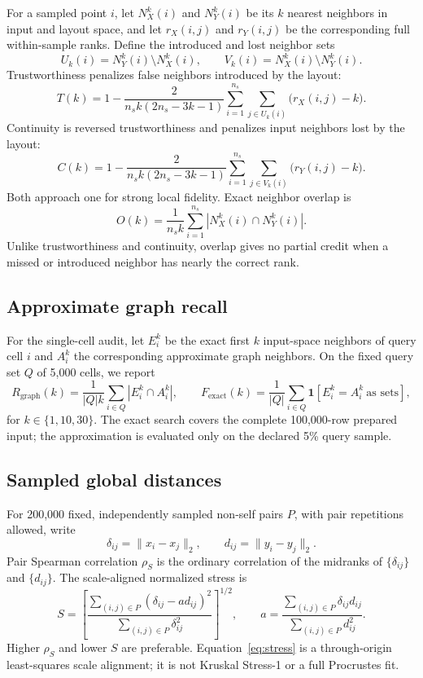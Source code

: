 \documentclass[10pt]{article}
\newcommand{\ind}{\mathbf{1}}
\begin{document}
For a sampled point $i$, let $N_X^k(i)$ and $N_Y^k(i)$ be its $k$ nearest neighbors in
input and layout space, and let $r_X(i,j)$ and $r_Y(i,j)$ be the corresponding full
within-sample ranks.  Define the introduced and lost neighbor sets
\[
 U_k(i)=N_Y^k(i)\setminus N_X^k(i),\qquad
 V_k(i)=N_X^k(i)\setminus N_Y^k(i).
\]
Trustworthiness \cite{trust} penalizes false neighbors introduced by the layout:
\begin{equation}
T(k)=1-\frac{2}{n_s k(2n_s-3k-1)}
 \sum_{i=1}^{n_s}\sum_{j\in U_k(i)}\bigl(r_X(i,j)-k\bigr).
\label{eq:trust}
\end{equation}
Continuity is reversed trustworthiness and penalizes input neighbors lost by the layout:
\begin{equation}
C(k)=1-\frac{2}{n_s k(2n_s-3k-1)}
 \sum_{i=1}^{n_s}\sum_{j\in V_k(i)}\bigl(r_Y(i,j)-k\bigr).
\label{eq:continuity}
\end{equation}
Both approach one for strong local fidelity.  Exact neighbor overlap is
\begin{equation}
O(k)=\frac{1}{n_s k}\sum_{i=1}^{n_s}
 \left|N_X^k(i)\cap N_Y^k(i)\right|.
\label{eq:overlap}
\end{equation}
Unlike trustworthiness and continuity, overlap gives no partial credit when a missed or
introduced neighbor has nearly the correct rank.

\subsection{Approximate graph recall}

For the single-cell audit, let $E_i^k$ be the exact first $k$ input-space neighbors of
query cell $i$ and $A_i^k$ the corresponding approximate graph neighbors.  On the fixed
query set $Q$ of 5,000 cells, we report
\[
 R_{\mathrm{graph}}(k)=\frac{1}{|Q|k}\sum_{i\in Q}|E_i^k\cap A_i^k|,
 \qquad
 F_{\mathrm{exact}}(k)=\frac{1}{|Q|}\sum_{i\in Q}
 \ind[E_i^k=A_i^k\ \text{as sets}],
\]
for $k\in\{1,10,30\}$.  The exact search covers the complete 100,000-row prepared input;
the approximation is evaluated only on the declared 5\% query sample.

\subsection{Sampled global distances}

For 200,000 fixed, independently sampled non-self pairs $P$, with pair repetitions
allowed, write
\[
 \delta_{ij}=\|x_i-x_j\|_2,\qquad d_{ij}=\|y_i-y_j\|_2.
\]
Pair Spearman correlation $\rho_S$ is the ordinary correlation of the midranks of
$\{\delta_{ij}\}$ and $\{d_{ij}\}$.  The scale-aligned normalized stress is
\begin{equation}
 S=\left[
 \frac{\sum_{(i,j)\in P}(\delta_{ij}-a d_{ij})^2}
      {\sum_{(i,j)\in P}\delta_{ij}^2}
 \right]^{1/2},\qquad
 a=\frac{\sum_{(i,j)\in P}\delta_{ij}d_{ij}}
          {\sum_{(i,j)\in P}d_{ij}^2}.
\label{eq:stress}
\end{equation}
Higher $\rho_S$ and lower $S$ are preferable.  Equation~\eqref{eq:stress} is a
through-origin least-squares scale alignment; it is not Kruskal Stress-1 or a full
Procrustes fit.
\end{document}
